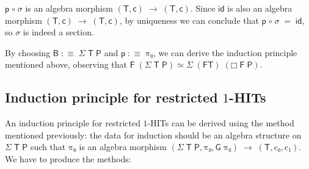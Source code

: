 \documentclass[a4paper,10pt]{article}
\newcommand{\Conid}[1]{\mathit{#1}}
\newcommand{\Varid}[1]{\mathit{#1}}
\renewcommand\Varid[1]{\mathord{\textsf{#1}}}
\let\Conid\Varid
\newcommand{\onehits}{$1$-HITs\xspace}
\newcommand{\ronehits}{restricted \onehits\xspace}
\begin{document}
\begin{center}
\end{center}

\ensuremath{\Varid{p}\;\Varid{∘}\;\Varid{σ}} is an algebra morphism \ensuremath{(\Conid{T},\Varid{c})\;\to \;(\Conid{T},\Varid{c})}. Since \ensuremath{\Varid{id}} is also
an algebra morphism \ensuremath{(\Conid{T},\Varid{c})\;\to \;(\Conid{T},\Varid{c})}, by uniqueness we can conclude
that \ensuremath{\Varid{p}\;\Varid{∘}\;\Varid{σ}\;=\;\Varid{id}}, so \ensuremath{\Varid{σ}} is indeed a section.

By choosing \ensuremath{\Conid{B}\;:\equiv\;\Conid{Σ}\;\Conid{T}\;\Conid{P}} and \ensuremath{\Varid{p}\;:\equiv\;\Varid{π₀}}, we can derive the induction
principle mentioned above, observing that \ensuremath{\Conid{F}\;(\Conid{Σ}\;\Conid{T}\;\Conid{P})\;\Varid{≃}\;\Conid{Σ}\;(\Conid{FT})\;(\Varid{□}\;\Conid{F}\;\Conid{P})}.

\subsection{Induction principle for \ronehits}

An induction principle for \ronehits can be derived using the method
mentioned previously: the data for induction should be an algebra
structure on \ensuremath{\Conid{Σ}\;\Conid{T}\;\Conid{P}} such that \ensuremath{\Varid{π₀}} is an algebra morphism \ensuremath{(\Conid{Σ}\;\Conid{T}\;\Conid{P},\Varid{π₀},\Conid{G}\;\Varid{π₀})\;\to \;(\Conid{T},\Varid{c₀},\Varid{c₁})}. We have to produce the methods:
\end{document}
